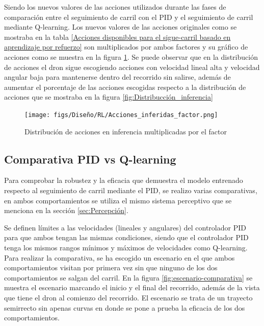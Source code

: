 Siendo los nuevos valores de las acciones utilizados durante las fases de comparación entre el seguimiento de carril con el PID y el seguimiento de carril mediante Q-learning. Los nuevos
valores de las acciones originales como se mostraba en la tabla \ref{Acciones disponibles para el sigue-carril basado en aprendizaje por refuerzo} son multiplicados por ambos factores
y su gráfico de acciones como se muestra en la figura \ref{fig:inferencia_factor}. Se puede observar que en la distribución de acciones el dron
sigue escogiendo acciones con velocidad lineal alta y velocidad angular baja para mantenerse dentro del recorrido sin salirse, además de aumentar el porcentaje de las acciones escogidas respecto a la distribución de acciones
que se mostraba en la figura \ref{fig:Distribucción_inferencia}

\begin{figure} [H]
  \begin{center}
    \texttt{[image: figs/Diseño/RL/Acciones\_inferidas\_factor.png]}
  \end{center}
  \caption{Distribución de acciones en inferencia multiplicadas por el factor}
  \label{fig:inferencia_factor}
\end{figure}

\subsection{Comparativa PID vs Q-learning}
\label{sec:Análisis y comparativa entre el seguiento de carril clásico}
Para comprobar la robustez y la eficacia que demuestra el modelo entrenado respecto al seguimiento de carril mediante el PID, se realizo varias comparativas, en ambos
comportamientos se utiliza el mismo sistema perceptivo que se menciona en la sección \ref{sec:Percepción}. 

Se definen límites a las velocidades (lineales y angulares) del controlador PID para que ambos tengan las mismas condiciones, siendo que el controlador PID tenga los mismos 
rangos mínimos y máximos de velocidades como Q-learning. Para realizar la comparativa, se ha escogido un escenario en el que ambos comportamientos visitan por primera vez 
sin que ninguno de los dos comportamientos se salgan del carril. En la figura \ref{fig:escenario-comparativa} se muestra el escenario marcando el inicio 
y el final del recorrido, además de la vista que tiene el dron al comienzo del recorrido. El escenario se trata de un trayecto semirrecto sin apenas curvas en donde se pone a prueba
la eficacia de los dos comportamientos. 


